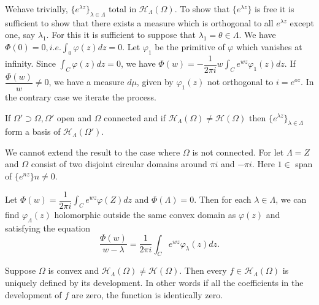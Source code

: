 We\pageoriginale have trivially, $\bigg\{ e^{\lambda z} \bigg\}_{\lambda \in
 \Lambda}$ total in $\mathscr{H}_\Lambda (\Omega)$. To show that
$\bigg\{ e^{\lambda z} \bigg\}$ is free it is sufficient to show that
there exists a measure which is orthogonal to all $e^{\lambda z}$
except one, say $\lambda_1$. For this it is sufficient to suppose 
that $\lambda_1 = \theta \in \Lambda$. We have $\Phi (0) = 0,
i.e. \int_0 \varphi(z) dz = 0$. Let $\varphi_1$ be the primitive of
$\varphi$ which vanishes at infinity. Since $\int_C \varphi (z) dz =
0$, we have $\Phi (w) = - \dfrac{1}{2 \pi i} w \int_C e^{wz} \varphi_1
(z) dz$. If $\dfrac{\Phi (w)}{w} \neq 0$, we have a measure $d \mu$,
given by $\varphi_1 (z)$ not orthogonal to $i = e^{oz}$. In the
contrary case we iterate the process.
 
\begin{coro*}%
 If $\Omega' \supset \Omega, \Omega'$ open and $\Omega$ connected and
 if $\mathscr{H}_\Lambda (\Omega) \neq \mathscr{H}(\Omega)$ then
 $\{e^{\lambda z}\}_{\lambda \in \Lambda}$ form a basis of
 $\mathscr{H}_\Lambda (\Omega')$. 
\end{coro*}

\begin{remark}\label{chap9:sec2:rem1}%
 We cannot extend the result to the case where $\Omega$ is not
 connected. For let $\Lambda = Z$ and $\Omega$ consist of two
 disjoint circular domains around $\pi i$ and $- \pi i$. Here $1 \in
 $ span of $\{e^{nz}\} n \neq 0$. 
\end{remark}

\begin{remark}\label{chap9:sec2:rem2}%
 Let $\Phi (w) = \dfrac{1}{2 \pi i} \int_C e^{wz} \varphi (Z) dz$ and
 $\Phi (\Lambda) = 0$. Then for each $\lambda \in \Lambda$, we can
 find $\varphi_\Lambda (z)$ holomorphic outside the same convex
 domain as $\varphi (z)$ and satisfying the equation 
 $$
 \frac{\Phi (w)}{w - \lambda} = \frac{1}{2 \pi i} \int_C e^{wz}
 \varphi_\lambda (z) dz. 
 $$
\end{remark}


\begin{theorem}\label{chap9:sec2:thm2}%
 Suppose $\Omega$ is convex and $\mathscr{H}_\Lambda (\Omega)
 \neq \mathscr{H} (\Omega)$. Then every $f \in \mathscr{H}_\Lambda
 (\Omega)$ is uniquely defined by its development. In other words
 if all the coefficients in the development of $f$ are zero, the
 function is identically zero. 
\end{theorem}

